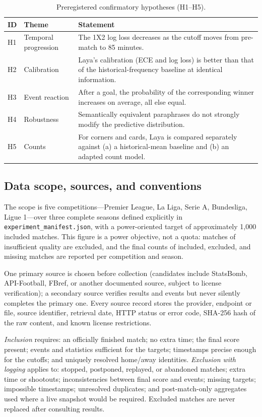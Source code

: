 \documentclass[11pt]{article}
\begin{document}
\begin{table}[t]
\centering
\small
\begin{tabular}{@{}p{0.9cm}p{2.6cm}p{11.2cm}@{}}
\toprule
\textbf{ID} & \textbf{Theme} & \textbf{Statement} \\
\midrule
H1 & Temporal progression & The 1X2 log loss decreases as the cutoff moves from
pre-match to 85 minutes. \\
H2 & Calibration & Laya's calibration (ECE and log loss) is better than that
of the historical-frequency baseline at identical information. \\
H3 & Event reaction & After a goal, the probability of the corresponding
winner increases on average, all else equal. \\
H4 & Robustness & Semantically equivalent paraphrases do not strongly modify
the predictive distribution. \\
H5 & Counts & For corners and cards, Laya is compared separately against (a) a
historical-mean baseline and (b) an adapted count model. \\
\bottomrule
\end{tabular}
\caption{Preregistered confirmatory hypotheses (H1--H5).}
\label{tab:hyp}
\end{table}

\subsection{Data scope, sources, and conventions}
\label{sec:data}

The scope is five competitions---Premier League, La Liga, Serie A, Bundesliga,
Ligue 1---over three complete seasons defined explicitly in
\texttt{experiment\_manifest.json}, with a power-oriented target of
approximately 1{,}000 included matches. This figure is a power objective, not a
quota: matches of insufficient quality are excluded, and the final counts of
included, excluded, and missing matches are reported per competition and
season.

One primary source is chosen before collection (candidates include
StatsBomb, API-Football, FBref, or another documented source, subject to
license verification); a secondary source verifies results and events but never
silently completes the primary one. Every source record stores the provider,
endpoint or file, source identifier, retrieval date, HTTP status or error
code, SHA-256 hash of the raw content, and known license restrictions.

\emph{Inclusion} requires: an officially finished match; no extra time; the
final score present; events and statistics sufficient for the targets;
timestamps precise enough for the cutoffs; and uniquely resolved home/away
identities. \emph{Exclusion with logging} applies to: stopped, postponed,
replayed, or abandoned matches; extra time or shootouts; inconsistencies
between final score and events; missing targets; impossible timestamps;
unresolved duplicates; and post-match-only aggregates used where a live
snapshot would be required. Excluded matches are never replaced after
consulting results.
\end{document}
